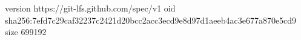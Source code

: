 version https://git-lfs.github.com/spec/v1
oid sha256:7efd7c29caf32237c2421d20bcc2acc3ecd9e8d97d1aeeb4ac3e677a870e5cd9
size 699192
